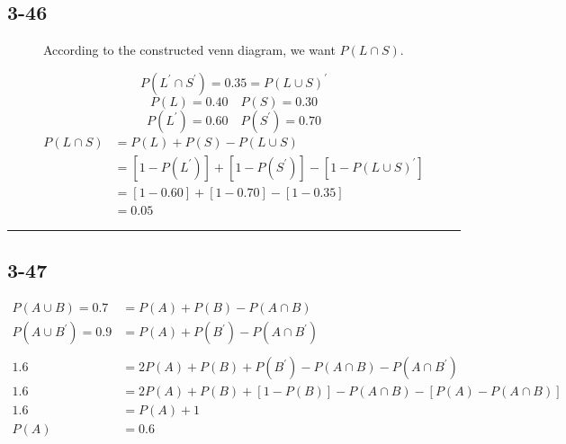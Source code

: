 \documentclass{article}
\newcommand{\qline}{\par\noindent\rule{4.5in}{1pt}}
\begin{document}
		\subsection*{3-46}

			\begin{figure}[!h]
				\centering
				 \par
				According to the constructed venn diagram, we want $P(L \cap S)$.
			\end{figure}
			\[
				P(L^\prime \cap S^\prime) = 0.35 = P(L \cup S)^\prime
			\]
			\[
				P(L) = 0.40 \quad P(S) = 0.30
			\]
			\[
				P(L^\prime) = 0.60 \quad P(S^\prime) = 0.70
			\]
			\begin{align*}
				P(L \cap S) &= P(L) + P(S) - P(L \cup S) \\
							&= \left[ 1 - P(L^\prime) \right] + \left[ 1 - P(S^\prime) \right] - \left[ 1 - P(L \cup S)^\prime \right] \\
							&= \left[ 1 - 0.60 \right] + \left[ 1 - 0.70 \right] - \left[ 1 - 0.35 \right] \\
							&= \boxed{0.05}
			\end{align*}

	\qline

		\subsection*{3-47}

			\begin{equation*}
				\begin{split}
					P(A \cup B) = 0.7 &= P(A) + P(B) - P(A \cap B) \\
					P(A \cup B^{\prime}) = 0.9 &= P(A) + P(B^{\prime}) - P(A \cap B^{\prime}) \\\\
					1.6 &= 2P(A) + P(B) + P(B^\prime) - P(A \cap B) - P(A \cap B^\prime) \\
					1.6 &= 2P(A) + P(B) + \left[ 1 - P(B) \right] - P(A \cap B) - \left[ P(A) - P(A \cap B) \right] \\
					1.6 &= P(A) + 1 \\
					P(A) &= \boxed{0.6}
				\end{split}
			\end{equation*}
\end{document}
